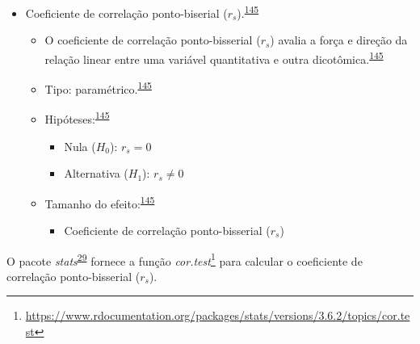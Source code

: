 \documentclass[
  a4paper,
]{book}
\providecommand{\tightlist}{%
  \setlength{\itemsep}{0pt}\setlength{\parskip}{0pt}}
\renewcommand{\href}[2]{#2\footnote{\url{#1}}}
\newenvironment{infobox}[1]
  {
  \begin{itemize}
  \renewcommand{\labelitemi}{
    \raisebox{-.7\height}[0pt][0pt]{
      {\setkeys{Gin}{width=3em,keepaspectratio}
        \texttt{[image: \#1]}}
    }
  }
  \setlength{\fboxsep}{1em}
  \begin{blackbox}
  \item
  }
  {
  \end{blackbox}
  \end{itemize}
  }
\begin{document}
\begin{itemize}
\item
  Coeficiente de correlação ponto-biserial (\(r_{s}\)).\textsuperscript{\protect\hyperlink{ref-khamis2008}{145}}

  \begin{itemize}
  \item
    O coeficiente de correlação ponto-bisserial (\(r_{s}\)) avalia a força e direção da relação linear entre uma variável quantitativa e outra dicotômica.\textsuperscript{\protect\hyperlink{ref-khamis2008}{145}}
  \item
    Tipo: paramétrico.\textsuperscript{\protect\hyperlink{ref-khamis2008}{145}}
  \item
    Hipóteses:\textsuperscript{\protect\hyperlink{ref-khamis2008}{145}}

    \begin{itemize}
    \item
      Nula (\(H_{0}\)): \(r_{s}=0\)
    \item
      Alternativa (\(H_{1}\)): \(r_{s}≠0\)
    \end{itemize}
  \item
    Tamanho do efeito:\textsuperscript{\protect\hyperlink{ref-khamis2008}{145}}

    \begin{itemize}
    \tightlist
    \item
      Coeficiente de correlação ponto-bisserial (\(r_{s}\))
    \end{itemize}
  \end{itemize}
\end{itemize}

\begin{infobox}{images/Rlogo}
O pacote \emph{stats}\textsuperscript{\protect\hyperlink{ref-stats-2}{29}} fornece a função \href{https://www.rdocumentation.org/packages/stats/versions/3.6.2/topics/cor.test}{\emph{cor.test}} para calcular o coeficiente de correlação ponto-bisserial (\(r_{s}\)).

\end{infobox}
\end{document}
